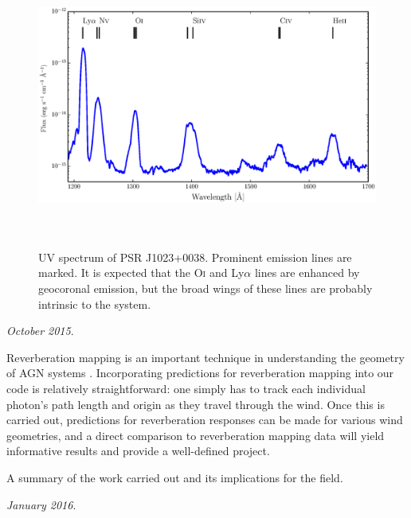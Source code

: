 \documentclass[useAMS,usenatbib,onecolumn]{mn2e2}
\begin{document}
\begin{figure}
\centering
\includegraphics[width=1.0\textwidth, height=3.7in, clip=true, trim=50 0 50 0]{figures/hst.eps}
\caption{UV spectrum of PSR J1023+0038. Prominent emission lines are marked. It is expected that 
the O\textsc{i} and Ly$\alpha$ lines are enhanced by geocoronal emission, but the broad wings of these lines
are probably intrinsic to the system.
}
\label{spec}
\end{figure}

\bigskip


 {\sl October 2015}.

 Reverberation mapping is an important technique in understanding 
the geometry of AGN systems \citep{peterson1998}. Incorporating predictions for reverberation mapping
into our code is relatively straightforward: one simply has to track each individual 
photon's path length and origin as they travel through the wind. Once this is carried out,
predictions for reverberation responses can be made for various wind geometries, and a direct comparison
to reverberation mapping data will yield informative results and provide a well-defined project.

\bigskip

 A summary of the work carried out and its implications for the field. 

  {\sl January 2016}.
\end{document}
